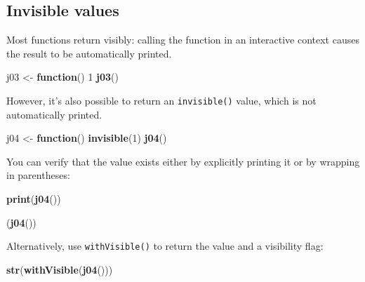 \documentclass[]{book}
\newenvironment{Shaded}{\begin{snugshade}}{\end{snugshade}}
\newcommand{\KeywordTok}[1]{\textcolor[rgb]{0.13,0.29,0.53}{\textbf{#1}}}
\newcommand{\DecValTok}[1]{\textcolor[rgb]{0.00,0.00,0.81}{#1}}
\newcommand{\StringTok}[1]{\textcolor[rgb]{0.31,0.60,0.02}{#1}}
\newcommand{\ControlFlowTok}[1]{\textcolor[rgb]{0.13,0.29,0.53}{\textbf{#1}}}
\newcommand{\NormalTok}[1]{#1}
\theoremstyle{definition}
\theoremstyle{definition}
\theoremstyle{definition}
\theoremstyle{remark}
\begin{document}
\subsection{Invisible values}\label{invisible-values}

Most functions return visibly: calling the function in an interactive
context causes the result to be automatically printed.

\begin{Shaded}
\begin{Highlighting}[]
\NormalTok{j03 <-}\StringTok{ }\ControlFlowTok{function}\NormalTok{() }\DecValTok{1}
\KeywordTok{j03}\NormalTok{()}
\end{Highlighting}
\end{Shaded}

However, it's also possible to return an \texttt{invisible()} value,
which is not automatically printed.

\begin{Shaded}
\begin{Highlighting}[]
\NormalTok{j04 <-}\StringTok{ }\ControlFlowTok{function}\NormalTok{() }\KeywordTok{invisible}\NormalTok{(}\DecValTok{1}\NormalTok{)}
\KeywordTok{j04}\NormalTok{()}
\end{Highlighting}
\end{Shaded}

You can verify that the value exists either by explicitly printing it or
by wrapping in parentheses:

\begin{Shaded}
\begin{Highlighting}[]
\KeywordTok{print}\NormalTok{(}\KeywordTok{j04}\NormalTok{())}
\end{Highlighting}
\end{Shaded}

\begin{Shaded}
\begin{Highlighting}[]
\NormalTok{(}\KeywordTok{j04}\NormalTok{())}
\end{Highlighting}
\end{Shaded}

Alternatively, use \texttt{withVisible()} to return the value and a
visibility flag:

\begin{Shaded}
\begin{Highlighting}[]
\KeywordTok{str}\NormalTok{(}\KeywordTok{withVisible}\NormalTok{(}\KeywordTok{j04}\NormalTok{()))}
\end{Highlighting}
\end{Shaded}
\end{document}
